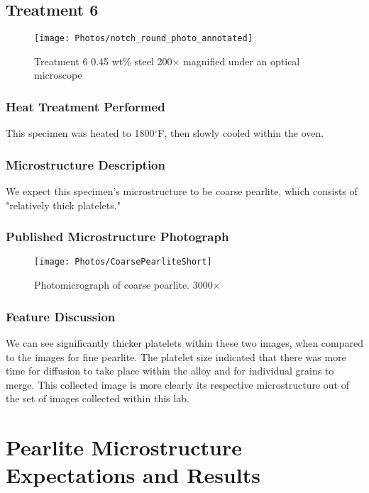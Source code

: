 \documentclass{article}
\newcommand{\degf}{$^\circ $F}
\begin{document}
\newpage

\subsection*{Treatment 6}
\begin{figure}[H]
\centering
\texttt{[image: Photos/notch\_round\_photo\_annotated]}
\caption{Treatment 6 0.45 wt\% steel 200$\times$ magnified under an optical microscope}
\end{figure}

\subsubsection*{Heat Treatment Performed}
This specimen was heated to 1800\degf, then slowly cooled within the oven.

\subsubsection*{Microstructure Description}
We expect this specimen's microstructure to be coarse pearlite, which consists of "relatively thick
platelets." \cite{book,ref:coarsePearl}

\subsubsection*{Published Microstructure Photograph}
\begin{figure}[H]
\centering
\texttt{[image: Photos/CoarsePearliteShort]}
\caption{Photomicrograph of coarse pearlite. 3000$\times$ \cite{ref:coarsePearl}}
\end{figure}

\subsubsection*{Feature Discussion}
We can see significantly thicker platelets within these two images, when compared to the images for fine pearlite. The platelet size indicated that there was more time for diffusion to take place within the alloy and for individual grains to merge. This collected image is more clearly its respective microstructure out of the set of images collected within this lab.

\newpage
\section{Pearlite Microstructure Expectations and Results}
\end{document}
